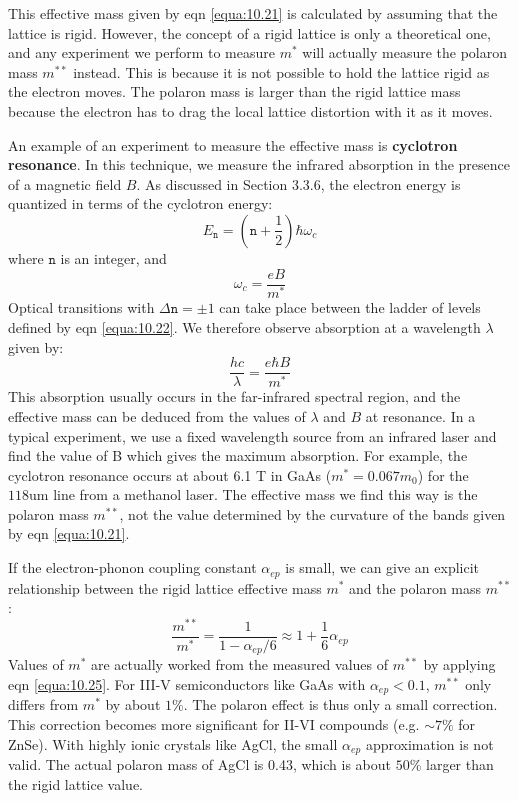 \documentclass[12pt]{book}
\def\um{\mathrm{um}}
\begin{document}
{This effective mass given by eqn \ref{equa:10.21} is calculated by assuming that the lattice is rigid. However, the concept of a rigid lattice is only a theoretical one, and any experiment we perform to measure $m^*$ will actually measure the polaron mass $m^{**}$ instead. This is because it is not possible to hold the lattice rigid as the electron moves. The polaron mass is larger than the rigid lattice mass because the electron has to drag the local lattice distortion with it as it moves.

An example of an experiment to measure the effective mass is \textbf{cyclotron resonance}. In this technique, we measure the infrared absorption in the presence of a magnetic field $B$. As discussed in Section 3.3.6, the electron energy is quantized in terms of the cyclotron energy:
\begin{equation}\label{equa:10.22}
  E_{\texttt{n}}=(\texttt{n}+\frac{1}{2})\hbar\omega_c
\end{equation}
where $\texttt{n}$ is an integer, and
\begin{equation}\label{equa:10.23}
  \omega_c=\frac{eB}{m^*}
\end{equation}
Optical transitions with $\Delta\texttt{n}=\pm1$ can take place between the ladder of levels defined by eqn \ref{equa:10.22}. We therefore observe absorption at a wavelength $\lambda$ given by:
\begin{equation}\label{equa:10.24}
  \frac{hc}{\lambda}=\frac{e\hbar B}{m^*}
\end{equation}
This absorption usually occurs in the far-infrared spectral region, and the effective mass can be deduced from the values of $\lambda$ and $B$ at resonance. In a typical experiment, we use a fixed wavelength source from an infrared laser and find the value of B which gives the maximum absorption. For example, the cyclotron resonance occurs at about 6.1 T in GaAs ($m^* = 0.067m_0$) for the $118\um$ line from a methanol laser. The effective mass we find this way is the polaron mass $m^{**}$, not the value determined by the curvature of the bands given by eqn \ref{equa:10.21}.

If the electron-phonon coupling constant $\alpha_{ep}$ is small, we can give an explicit relationship between the rigid lattice effective mass $m^*$ and the polaron mass $m^{**}$:
\begin{equation}\label{equa:10.25}
  \frac{m^{**}}{m^*}=\frac{1}{1-\alpha_{ep}/6}\approx1+\frac{1}{6}\alpha_{ep}
\end{equation}
Values of $m^*$ are actually worked from the measured values of $m^{**}$ by applying eqn \ref{equa:10.25}. For III-V semiconductors like GaAs with $\alpha_{ep}< 0.1$, $m^{**}$ only differs from $m^*$ by about $1\%$. The polaron effect is thus only a small correction. This correction becomes more significant for II-VI compounds (e.g. $\sim7\%$ for ZnSe). With highly ionic crystals like AgCl, the small $\alpha_{ep}$ approximation is not valid. The actual polaron mass of AgCl is 0.43, which is about $50\%$ larger than the rigid lattice value.

}
\end{document}
